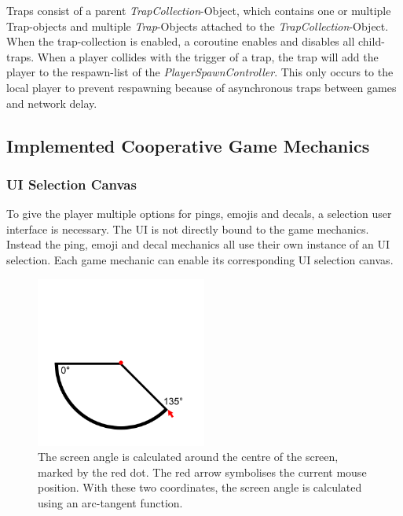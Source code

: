 Traps consist of a parent \textit{TrapCollection}-Object, which contains one or multiple Trap-objects and multiple \textit{Trap}-Objects attached to the \textit{TrapCollection}-Object.
When the trap-collection is enabled, a coroutine enables and disables all child-traps. When a player collides with the trigger of a trap, the trap will add the player to the respawn-list of the \textit{PlayerSpawnController}. This only occurs to the local player to prevent respawning because of asynchronous traps between games and network delay.


\subsection{Implemented Cooperative Game Mechanics}
\label{section:Implemented cooperative game mechanics}

\subsubsection{UI Selection Canvas}

To give the player multiple options for pings, emojis and decals, a selection user interface is necessary. The UI is not directly bound to the game mechanics. Instead the ping, emoji and decal mechanics all use their own instance of an UI selection.
Each game mechanic can enable its corresponding UI selection canvas.

\begin{figure}
    \centering
    \includegraphics[width=0.5\textwidth]{images/angle_calculation.png}
    \caption{The screen angle is calculated around the centre of the screen, marked by the red dot. The red arrow symbolises the current mouse position. With these two coordinates, the screen angle is calculated using an arc-tangent function.}
    \label{fig:angle calculation}
\end{figure}


